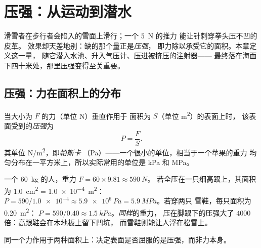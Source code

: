 \chapter{压强：从运动到潜水}\label{ch:g10:pressure}

滑雪者在步行者会陷入的雪面上滑行；一个 \qty{5}{N} 的推力
能让针刺穿拳头压不凹的皮革。
效果却天差地别：缺的那个量正是\emph{压强}，
即力除以承受它的面积。本章定义这一量，
随它潜入水池、升入气压计、压进被挤压的注射器——
最终落在海面下四十米处，那里压强变得至关重要。

\section{压强：力在面积上的分布}

\begin{definition}[压强]\label{def:g10:pressure:pressure}
当大小为 $F$ 的力（单位 \unit{N}）垂直作用于
面积为 $S$（单位 \unit{m^2}）的表面上时，
该表面受到的\emph{压强}为
\[
P = \frac{F}{S}.
\]
其单位 \unit{N/m^2}，即\emph{帕斯卡}
（\unit{Pa}）——一个很小的单位，相当于一个苹果的重力
均匀分布在一平方米上，所以实际常用的单位是 \unit{kPa} 和 \unit{MPa}。
\end{definition}

\begin{example}[高跟鞋与雪鞋]\label{ex:g10:pressure:snowshoe}
一个 \qty{60}{kg} 的人，重力 $F = 60 \times 9.81 \approx \qty{590}{N}$。
若全压在一只细高跟上，其面积为 \qty{1.0}{cm^2} = \qty{1.0e-4}{m^2}：
$P = 590/\num{1.0e-4} \approx \qty{5.9e6}{Pa} = \qty{5.9}{MPa}$。若穿两只
雪鞋，每只面积为 \qty{0.20}{m^2}：
$P = 590/0.40 \approx \qty{1.5}{kPa}$。\emph{同样}的重力，
压在脚跟下的压强大了 $4000$ 倍：高跟鞋会在木地板上留下凹坑，
而雪鞋则能让人浮在松雪上。
\end{example}

\begin{omfigure}
\qquad
{}

{\small 同一个力作用于两种面积上：决定表面是否屈服的是压强，而非力本身。}
\end{omfigure}

